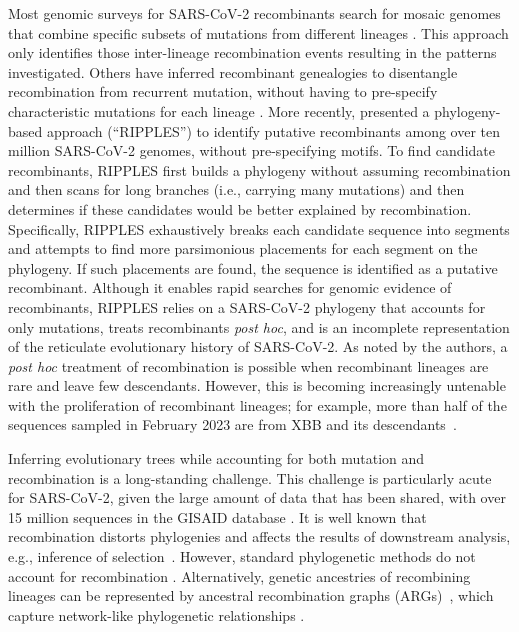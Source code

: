 \documentclass{article}
\begin{document}
Most genomic surveys for SARS-CoV-2 recombinants search for mosaic genomes that
combine specific subsets of mutations from different lineages
\citep[e.g.][]{VanInsberghe2021-eu,Jackson2021-ik,Wertheim2022-hj,Sekizuka2022-xz}.
This approach only identifies those inter-lineage recombination events
resulting in the patterns investigated. Others have inferred recombinant
genealogies to disentangle recombination from recurrent mutation, without
having to pre-specify characteristic mutations for each lineage
\citep{Ignatieva2021-rg}. More recently, \cite{Turakhia2022-it}
presented a phylogeny-based approach (``RIPPLES'') to identify putative
recombinants among over ten million SARS-CoV-2 genomes, without pre-specifying motifs.
To find candidate recombinants, RIPPLES first builds a phylogeny
without assuming recombination and then scans for long branches (i.e., carrying
many mutations) and then determines if these candidates would be better
explained by recombination. Specifically, RIPPLES exhaustively breaks each
candidate sequence into segments and attempts to find more parsimonious
placements for each segment on the phylogeny. If such placements are found, the
sequence is identified as a putative recombinant. Although it enables rapid
searches for genomic evidence of recombinants, RIPPLES relies on a SARS-CoV-2
phylogeny that accounts for only mutations, treats recombinants
\textit{post hoc}, and is an incomplete representation of the reticulate evolutionary
history of SARS-CoV-2. As noted by the authors, a \textit{post hoc} treatment
of recombination is possible when recombinant lineages are rare and leave few
descendants. However, this is becoming increasingly untenable with the proliferation
of recombinant lineages; for example, more than half of the sequences sampled in
February 2023 are from XBB and its descendants~\citep{Chen2022-pz}.

Inferring evolutionary trees while accounting for both mutation and
recombination is a long-standing challenge. This challenge is particularly
acute for SARS-CoV-2, given the large amount of data that has been shared, with
over 15 million sequences in the GISAID database \citep{Shu2017-hp}. It is well
known that recombination distorts phylogenies \citep{Schierup2000-fg} and
affects the results of downstream analysis, e.g., inference of
selection~\citep{Anisimova2003-vr}.
However, standard phylogenetic methods do not account
for recombination \citep[e.g.][]{Ronquist2012-zw,Minh2020-lr,Guindon2003-zd}.
Alternatively, genetic ancestries of recombining lineages can be represented by
ancestral recombination graphs (ARGs)~\citep{Griffiths1981-lw,Hudson1983-if},
which  capture network-like phylogenetic relationships \citep{Gusfield2014-qw}.
\end{document}
